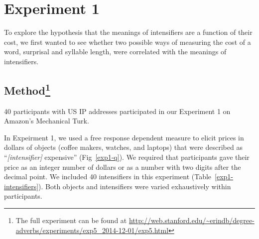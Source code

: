\documentclass[10pt,letterpaper]{article}
\begin{document}

\section{Experiment 1}

To explore the hypothesis that the meanings of intensifiers are a function of their cost, we first wanted to see whether two possible ways of measuring the cost of a word, surprisal and syllable length, were correlated with the meanings of intensifiers.

\subsection{Method\footnote{The full experiment can be found at \url{http://web.stanford.edu/~erindb/degree-adverbs/experiments/exp5_2014-12-01/exp5.html}}}

40 participants with US IP addresses participated in our Experiment 1 on Amazon's Mechanical Turk.

In Expeirment 1, we used a free response dependent measure to elicit prices in dollars of objects (coffee makers, watches, and laptops) that were described as ``\emph{[intensifier]} expensive'' (Fig~\ref{exp1-q}). We required that participants gave their price as an integer number of dollars or as a number with two digits after the decimal point. We included 40 intensifiers in this experiment (Table~\ref{exp1-intensifiers}). Both objects and intensifiers were varied exhaustively within participants.
\end{document}
